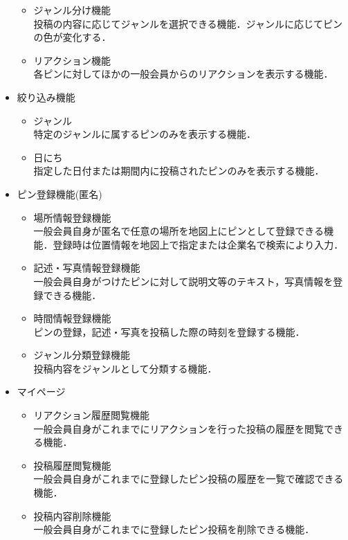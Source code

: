 \begin{itemize}[itemsep=10pt]
\begin{itemize}[itemsep=10pt]
        \item ジャンル分け機能 \mbox{}\\
        投稿の内容に応じてジャンルを選択できる機能．ジャンルに応じてピンの色が変化する．
        \item  リアクション機能 \mbox{}\\
        各ピンに対してほかの一般会員からのリアクションを表示する機能．
    \end{itemize}
    \item 絞り込み機能
    \begin{itemize}[itemsep=10pt]
        \item ジャンル \mbox{}\\
        特定のジャンルに属するピンのみを表示する機能．
        \item 日にち \mbox{}\\
        指定した日付または期間内に投稿されたピンのみを表示する機能．
    \end{itemize}
    \item ピン登録機能(匿名)
    \begin{itemize}[itemsep=10pt]
        \item 場所情報登録機能 \mbox{}\\
        一般会員自身が匿名で任意の場所を地図上にピンとして登録できる機能．登録時は位置情報を地図上で指定または企業名で検索により入力．
        \item 記述・写真情報登録機能 \mbox{}\\
        一般会員自身がつけたピンに対して説明文等のテキスト，写真情報を登録できる機能．
        \item 時間情報登録機能 \mbox{}\\
        ピンの登録，記述・写真を投稿した際の時刻を登録する機能．
        \item ジャンル分類登録機能 \mbox{}\\
        投稿内容をジャンルとして分類する機能．
    \end{itemize}
    \item マイページ
    \begin{itemize}[itemsep=10pt]
        \item リアクション履歴閲覧機能 \mbox{}\\
        一般会員自身がこれまでにリアクションを行った投稿の履歴を閲覧できる機能．
        \item 投稿履歴閲覧機能 \mbox{}\\
        一般会員自身がこれまでに登録したピン投稿の履歴を一覧で確認できる機能．
        \item 投稿内容削除機能 \mbox{}\\
        一般会員自身がこれまでに登録したピン投稿を削除できる機能．
    \end{itemize}
\end{itemize}

